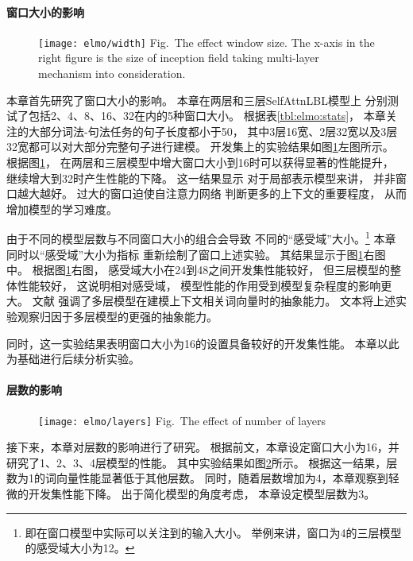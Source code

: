\paragraph{窗口大小的影响}
\begin{figure}[t]
	\centering
	\texttt{[image: elmo/width]}
	{Fig.~$\!$}{The effect window size. 
		The x-axis in the right figure is the size of inception field
		taking multi-layer mechanism into consideration.\label{fig:elmo:ana:width}
	}
\end{figure}
本章首先研究了窗口大小的影响。
本章在两层和三层SelfAttnLBL模型上
分别测试了包括2、4、8、16、32在内的5种窗口大小。
根据表\ref{tbl:elmo:stats}，
本章关注的大部分词法-句法任务的句子长度都小于50，
其中3层16宽、2层32宽以及3层32宽都可以对大部分完整句子进行建模。
开发集上的实验结果如图\ref{fig:elmo:ana:width}左图所示。
根据图\ref{fig:elmo:ana:width}，
在两层和三层模型中增大窗口大小到16时可以获得显著的性能提升，
继续增大到32时产生性能的下降。
这一结果显示
对于局部表示模型来讲，
并非窗口越大越好。
过大的窗口迫使自注意力网络
判断更多的上下文的重要程度，
从而增加模型的学习难度。

由于不同的模型层数与不同窗口大小的组合会导致
不同的``感受域''大小。\footnote{即在窗口模型中实际可以关注到的输入大小。
	举例来讲，窗口为4的三层模型的感受域大小为12。}
本章同时以``感受域''大小为指标
重新绘制了窗口上述实验。
其结果显示于图\ref{fig:elmo:ana:width}右图中。
根据图\ref{fig:elmo:ana:width}右图，
感受域大小在24到48之间开发集性能较好，
但三层模型的整体性能较好，
这说明相对感受域，
模型性能的作用受到模型复杂程度的影响更大。
文献
强调了多层模型在建模上下文相关词向量时的抽象能力。
文本将上述实验观察归因于多层模型的更强的抽象能力。

同时，这一实验结果表明窗口大小为16的设置具备较好的开发集性能。
本章以此为基础进行后续分析实验。

\paragraph{层数的影响}
\begin{figure}[t]
	\centering
	\texttt{[image: elmo/layers]}
	{Fig.~$\!$}{The effect of number of layers\label{fig:elmo:ana:layers}
	}
\end{figure}
接下来，本章对层数的影响进行了研究。
根据前文，本章设定窗口大小为16，并研究了1、2、3、4层模型的性能。
其中实验结果如图\ref{fig:elmo:ana:layers}所示。
根据这一结果，层数为1的词向量性能显著低于其他层数。
同时，随着层数增加为4，本章观察到轻微的开发集性能下降。
出于简化模型的角度考虑，
本章设定模型层数为3。

